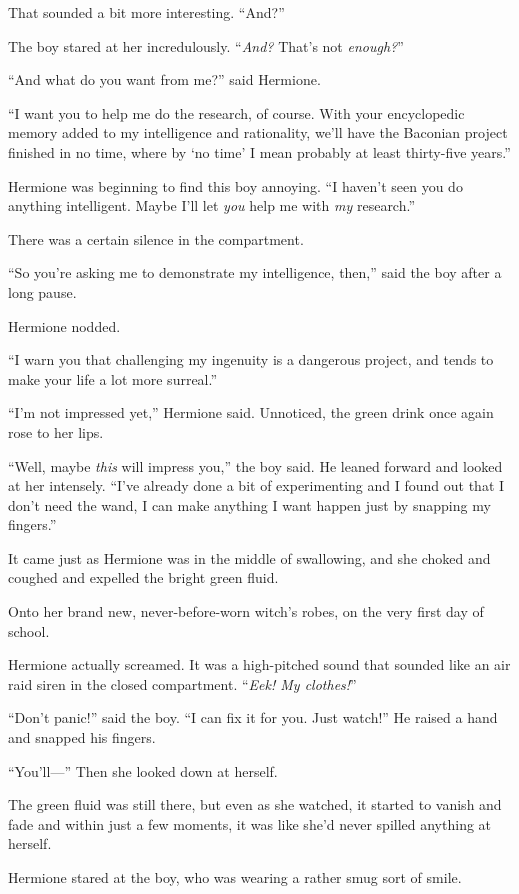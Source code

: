 That sounded a bit more interesting. “And?”

The boy stared at her incredulously. “\emph{And?} That’s not \emph{enough?}”

“And what do you want from me?” said Hermione.

“I want you to help me do the research, of course. With your encyclopedic memory added to my intelligence and rationality, we’ll have the Baconian project finished in no time, where by ‘no time’ I mean probably at least thirty-five years.”

Hermione was beginning to find this boy annoying. “I haven’t seen you do anything intelligent. Maybe I’ll let \emph{you} help me with \emph{my} research.”

There was a certain silence in the compartment.

“So you’re asking me to demonstrate my intelligence, then,” said the boy after a long pause.

Hermione nodded.

“I warn you that challenging my ingenuity is a dangerous project, and tends to make your life a lot more surreal.”

“I’m not impressed yet,” Hermione said. Unnoticed, the green drink once again rose to her lips.

“Well, maybe \emph{this} will impress you,” the boy said. He leaned forward and looked at her intensely. “I’ve already done a bit of experimenting and I found out that I don’t need the wand, I can make anything I want happen just by snapping my fingers.”

It came just as Hermione was in the middle of swallowing, and she choked and coughed and expelled the bright green fluid.

Onto her brand new, never-before-worn witch’s robes, on the very first day of school.

Hermione actually screamed. It was a high-pitched sound that sounded like an air raid siren in the closed compartment. “\emph{Eek! My clothes!}”

“Don’t panic!” said the boy. “I can fix it for you. Just watch!” He raised a hand and snapped his fingers.

“You’ll—” Then she looked down at herself.

The green fluid was still there, but even as she watched, it started to vanish and fade and within just a few moments, it was like she’d never spilled anything at herself.

Hermione stared at the boy, who was wearing a rather smug sort of smile.

